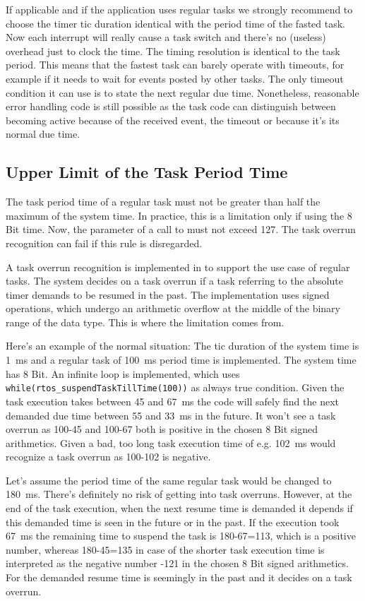 If applicable and if the application uses regular tasks we strongly
recommend to choose the timer tic duration identical with the period time
of the fasted task. Now each interrupt will really cause a task switch and
there's no (useless) overhead just to clock the time. The timing
resolution is identical to the task period. This means that the fastest
task can barely operate with timeouts, for example if it needs to wait for
events posted by other tasks. The only timeout condition it can use is to
state the next regular due time. Nonetheless, reasonable error handling
code is still possible as the task code can distinguish between becoming
active because of the received event, the timeout or because it's its
normal due time.


\subsection{Upper Limit of the Task Period Time}

The task period time of a regular task must not be greater than half the
maximum of the system time. In practice, this is a limitation only if
using the 8 Bit time. Now, the parameter of a call to
 must not exceed 127. The task overrun
recognition can fail if this rule is disregarded.

A task overrun recognition is implemented in \rtos{} to support the use case
of regular tasks. The system decides on a task overrun if a task referring
to the absolute timer demands to be resumed in the past. The
implementation uses signed operations, which undergo an arithmetic
overflow at the middle of the binary range of the data type. This is where
the limitation comes from.

Here's an example of the normal situation: The tic duration of the system
time is 1~ms and a regular task of 100~ms period time is implemented. The
system time has 8 Bit. An infinite loop is implemented, which uses
\verb+while(rtos_suspendTaskTillTime(100))+ as always true condition.
Given the task execution takes between 45 and 67~ms the \rtos{} code will
safely find the next demanded due time between 55 and 33~ms in the future.
It won't see a task overrun as 100-45 and 100-67 both is positive in the
chosen 8 Bit signed arithmetics. Given a bad, too long task execution time
of e.g. 102~ms \rtos{} would recognize a task overrun as 100-102 is
negative.

Let's assume the period time of the same regular task would be changed to
180~ms. There's definitely no risk of getting into task overruns. However,
at the end of the task execution, when the next resume time is demanded it
depends if this demanded time is seen in the future or in the past. If the
execution took 67~ms the remaining time to suspend the task is 180-67=113,
which is a positive number, whereas 180-45=135 in case of the shorter task
execution time is interpreted as the negative number -121 in the chosen 8
Bit signed arithmetics. For \rtos{} the demanded resume time is seemingly
in the past and it decides on a task overrun.

